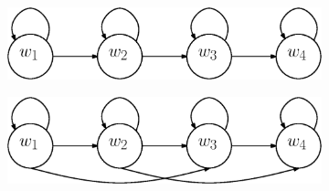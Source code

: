 \documentclass[a4paper, oneside]{csthesis}
\begin{document}
\begin{figure}
        \centering
        \begin{subfigure}[b]{0.45\textwidth}
                \centering
                \includegraphics[width=\textwidth]{figures/hmm-ltr1.eps}
                \label{fig:hmm1}
        \end{subfigure}%
        \quad
        \begin{subfigure}[b]{0.45\textwidth}
                \centering
                \includegraphics[width=\textwidth]{figures/hmm-ltr2.eps}
                \label{fig:hmm1}
        \end{subfigure}%


\end{figure}
\end{document}
